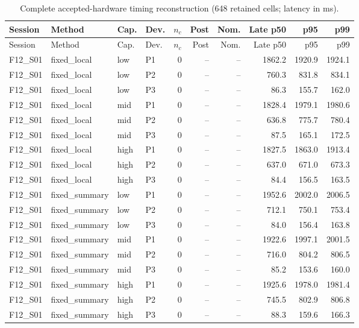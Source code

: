 \begin{longtable}{llllrrrrrr}
\caption{Complete accepted-hardware timing reconstruction (648 retained cells; latency in ms).}\label{tab:timingfull}\\
\toprule
Session & Method & Cap. & Dev. & $n_c$ & Post & Nom. & Late p50 & p95 & p99 \\
\midrule
\endfirsthead
\toprule
Session & Method & Cap. & Dev. & $n_c$ & Post & Nom. & Late p50 & p95 & p99 \\
\midrule
\endhead
F12\_S01 & fixed\_local & low & P1 & 0 & -- & -- & 1862.2 & 1920.9 & 1924.1 \\
F12\_S01 & fixed\_local & low & P2 & 0 & -- & -- & 760.3 & 831.8 & 834.1 \\
F12\_S01 & fixed\_local & low & P3 & 0 & -- & -- & 86.3 & 155.7 & 162.0 \\
F12\_S01 & fixed\_local & mid & P1 & 0 & -- & -- & 1828.4 & 1979.1 & 1980.6 \\
F12\_S01 & fixed\_local & mid & P2 & 0 & -- & -- & 636.8 & 775.7 & 780.4 \\
F12\_S01 & fixed\_local & mid & P3 & 0 & -- & -- & 87.5 & 165.1 & 172.5 \\
F12\_S01 & fixed\_local & high & P1 & 0 & -- & -- & 1827.5 & 1863.0 & 1913.4 \\
F12\_S01 & fixed\_local & high & P2 & 0 & -- & -- & 637.0 & 671.0 & 673.3 \\
F12\_S01 & fixed\_local & high & P3 & 0 & -- & -- & 84.4 & 156.5 & 163.5 \\
F12\_S01 & fixed\_summary & low & P1 & 0 & -- & -- & 1952.6 & 2002.0 & 2006.5 \\
F12\_S01 & fixed\_summary & low & P2 & 0 & -- & -- & 712.1 & 750.1 & 753.4 \\
F12\_S01 & fixed\_summary & low & P3 & 0 & -- & -- & 84.0 & 156.4 & 163.8 \\
F12\_S01 & fixed\_summary & mid & P1 & 0 & -- & -- & 1922.6 & 1997.1 & 2001.5 \\
F12\_S01 & fixed\_summary & mid & P2 & 0 & -- & -- & 716.0 & 804.2 & 806.5 \\
F12\_S01 & fixed\_summary & mid & P3 & 0 & -- & -- & 85.2 & 153.6 & 160.0 \\
F12\_S01 & fixed\_summary & high & P1 & 0 & -- & -- & 1925.6 & 1978.0 & 1981.4 \\
F12\_S01 & fixed\_summary & high & P2 & 0 & -- & -- & 745.5 & 802.9 & 806.8 \\
F12\_S01 & fixed\_summary & high & P3 & 0 & -- & -- & 88.3 & 159.6 & 166.3 \\

\end{longtable}
